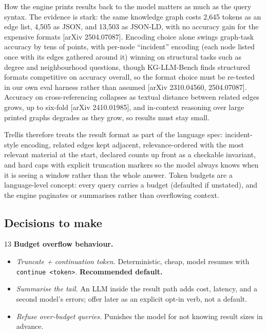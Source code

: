 \documentclass[11pt]{article}
\begin{document}
How the engine prints results back to the model matters as much as the query syntax. The evidence is stark: the same knowledge graph costs 2{,}645 tokens as an edge list, 4{,}505 as JSON, and 13{,}503 as JSON-LD, with no accuracy gain for the expensive formats [arXiv 2504.07087]. Encoding choice alone swings graph-task accuracy by tens of points, with per-node ``incident'' encoding (each node listed once with its edges gathered around it) winning on structural tasks such as degree and neighbourhood questions, though KG-LLM-Bench finds structured formats competitive on accuracy overall, so the format choice must be re-tested in our own eval harness rather than assumed [arXiv 2310.04560, 2504.07087]. Accuracy on cross-referencing collapses as textual distance between related edges grows, up to six-fold [arXiv 2410.01985], and in-context reasoning over large printed graphs degrades as they grow, so results must stay small.

Trellis therefore treats the result format as part of the language spec: incident-style encoding, related edges kept adjacent, relevance-ordered with the most relevant material at the start, declared counts up front as a checkable invariant, and hard caps with explicit truncation markers so the model always knows when it is seeing a window rather than the whole answer. Token budgets are a language-level concept: every query carries a budget (defaulted if unstated), and the engine paginates or summarises rather than overflowing context.

\subsection{Decisions to make}

\begin{decisionbox}{13}
\textbf{Budget overflow behaviour.}
\begin{itemize}[leftmargin=1.4em,itemsep=1pt]
  \item[A.] \emph{Truncate + continuation token.} Deterministic, cheap, model resumes with \texttt{continue <token>}. \textbf{Recommended default.}
  \item[B.] \emph{Summarise the tail.} An LLM inside the result path adds cost, latency, and a second model's errors; offer later as an explicit opt-in verb, not a default.
  \item[C.] \emph{Refuse over-budget queries.} Punishes the model for not knowing result sizes in advance.
\end{itemize}
\end{decisionbox}
\end{document}
